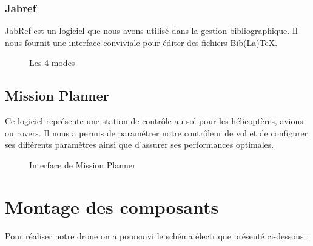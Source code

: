 	\subsubsection{Jabref}
	JabRef est un logiciel que nous avons utilisé dans la gestion bibliographique. Il nous fournit une interface conviviale pour éditer des fichiers Bib(La)TeX.
	\begin{figure}[h]
		\begin{center}
			\centering
		\end{center}
		\caption{Les 4 modes}
	\end{figure}
	\subsection{Mission Planner	}
	Ce logiciel représente une station de contrôle au sol pour les hélicoptères, avions ou rovers. Il nous a permis de paramétrer notre contrôleur de vol et de configurer ses différents paramètres ainsi que d'assurer ses performances optimales.
	\begin{figure} [h]
		\begin{center}
			\centering
			\hspace*{1.5cm}
			\centering
			\hspace*{1.5cm}	\caption{Interface de Mission Planner}
		\end{center}
	\end{figure}
	\newpage
	\section{Montage des composants}
	Pour réaliser notre drone on a poursuivi le schéma électrique présenté ci-dessous :
	
